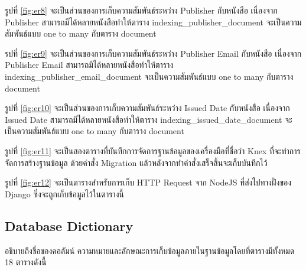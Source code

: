 รูปที่ \ref{fig:er8} จะเป็นส่วนของการเก็บความสัมพันธ์ระหว่าง Publisher กับหนังสือ เนื่องจาก Publisher สามารถมีได้หลายหนังสือทำให้ตาราง indexing\_publisher\_document จะเป็นความสัมพันธ์แบบ one to many กับตาราง document 

รปที่ \ref{fig:er9} จะเป็นส่วนของการเก็บความสัมพันธ์ระหว่าง Publisher Email กับหนังสือ เนื่องจาก Publisher Email สามารถมีได้หลายหนังสือทำให้ตาราง indexing\_publisher\_email\_document จะเป็นความสัมพันธ์แบบ one to many กับตาราง document

รูปที่ \ref{fig:er10} จะเป็นส่วนของการเก็บความสัมพันธ์ระหว่าง Issued Date กับหนังสือ เนื่องจาก Issued Date สามารถมีได้หลายหนังสือทำให้ตาราง indexing\_issued\_date\_document จะเป็นความสัมพันธ์แบบ one to many กับตาราง document 

รูปที่ \ref{fig:er11} จะเป็นสองตารางที่บันทึกการจัดการฐานข้อมูลของเครื่องมือที่ชื่อว่า Knex ที่จะทำการจัดการสร้างฐานข้อมูล ด้วยคำสั่ง Migration แล้วหลังจากทำคำสั่งเสร็จสิ้นจะเก็บบันทึกไว้

รูปที่ \ref{fig:er12} จะเป็นตารางสำหรับการเก็บ HTTP Request จาก NodeJS ที่ส่งไปทางฝั่งของ Django ซึ่งจะถูกเก็บข้อมูลไว้ในตารางนี้

\subsection{Database Dictionary}

อธิบายถึงชื่อของคอลัมน์ ความหมายและลักษณะการเก็บข้อมูลภายในฐานข้อมูลโดยที่ตารางมีทั้งหมด 18 ตารางดังนี้



